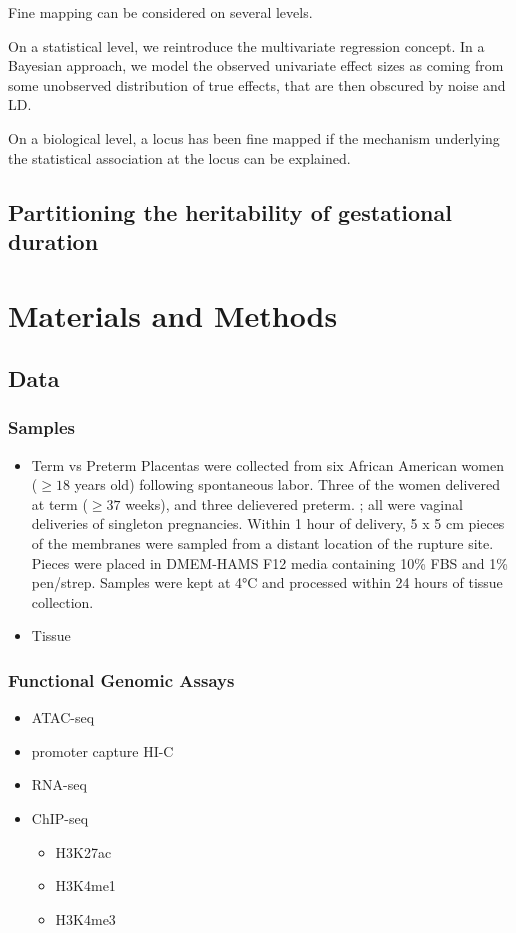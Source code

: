 Fine mapping can be considered on several levels.

On a statistical level, we reintroduce the multivariate regression concept.  In a Bayesian approach,
we model the observed univariate effect sizes as coming from some unobserved distribution of true effects,
that are then obscured by noise and LD.

On a biological level, a locus has been fine mapped if the mechanism underlying the statistical association at the locus can be explained.



\subsection*{Partitioning the heritability of gestational duration}
\label{sec:org0c751ad}




\section*{Materials and Methods}
\label{sec:org39326e2}

\subsection*{Data}
\label{sec:org702e301}
\subsubsection*{Samples}
\label{sec:orgbbced86}
\begin{itemize}
\item Term vs Preterm
\label{sec:org84e798f}
Placentas were collected from six African American women (\(\geq 18\) years old) following spontaneous labor.
Three of the women delivered at term (\(\geq 37\) weeks), and three delievered preterm.
; all were vaginal deliveries of singleton pregnancies. 
Within 1 hour of delivery, 5 x 5 cm pieces of the membranes were sampled from a distant location of the rupture site. 
Pieces were placed in DMEM-HAMS F12 media containing 10\% FBS and 1\% pen/strep.
 Samples were kept at 4°C and processed within 24 hours of tissue collection. 

\item Tissue
\label{sec:org5ff2260}
\end{itemize}
\subsubsection*{Functional Genomic Assays}
\label{sec:org6fc5644}
\begin{itemize}
\item ATAC-seq
\item promoter capture HI-C
\item RNA-seq
\item ChIP-seq
\begin{itemize}
\item H3K27ac
\item H3K4me1
\item H3K4me3
\end{itemize}
\end{itemize}


